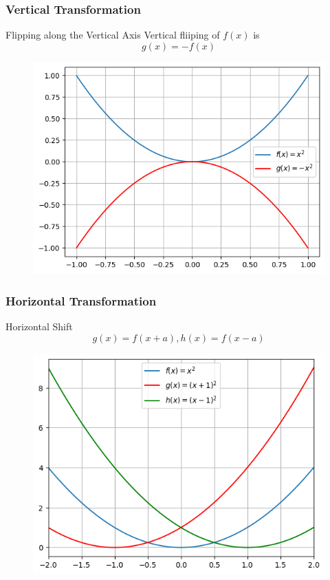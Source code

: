 \documentclass{beamer}
\begin{document}
\begin{frame}
  \frametitle{Vertical Transformation}
  \begin{block}{Flipping along the Vertical Axis} 
    Vertical fliiping of \(f(x) \) is 
    \[g(x) = - f (x) \]
  \end{block}
  \begin{figure}[h]    
    \centering
    \includegraphics[scale=0.5]{vertical_flip.png}
    \end{figure}
\end{frame}
\begin{frame}
  \frametitle{Horizontal Transformation}
  \begin{block}{Horizontal Shift}
    \[g(x) = f(x+a), h(x) = f(x-a)\]
  \end{block}
  \begin{figure}[h]    
    \centering
    \includegraphics[scale=0.5]{horizontal-shift.png}
    \end{figure}
  \end{frame}
\end{document}
